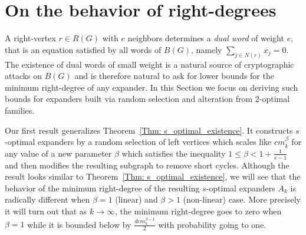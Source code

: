 \documentclass[12pt]{amsart}
\theoremstyle{definition}
\renewcommand{\leq}{\leqslant}
\newcommand{\1}{\ensuremath{\mathbb{1}}}
\begin{document}
\section{On the behavior of right-degrees}\label{Sec: RD}
A right-vertex $r\in R(G)$ with $e$ neighbors determines a \emph{dual word}  of weight $e$, that is an equation satisfied by all words of $B(G)$, namely $\sum _{j\in N(r)} x_j=0$. The existence of dual words of small weight is a natural source of cryptographic attacks on $B(G)$ and is therefore natural to ask for lower bounds for the minimum right-degree of any expander. In this Section we focus on deriving such bounds for expanders built via random selection and alteration from $2$-optimal families.

Our first result generalizes Theorem~\ref{Thm: s_optimal_existence}. It constructs $s$-optimal expanders by a random selection of left vertices which scales like $cm_k^{\beta}$ for any value of a new parameter $\beta$ which satisfies the inequality $1\leq \beta <1 +\frac{1}{s-1}$ and then modifies the resulting subgraph to remove short cycles.  Although the result looks similar to Theorem~\ref{Thm: s_optimal_existence}, we will see that the behavior of the minimum right-degree of the resulting $s$-optimal expanders $A_k$ is radically different when $\beta=1$ (linear) and $\beta>1$ (non-linear) case. More precisely it will turn out that  as $k\rightarrow \infty$, the minimum right-degree goes to zero when $\beta=1$ while it is bounded below by $\frac{dcm_k^{\beta-1}}{2}$ with probability going to one.
\end{document}
